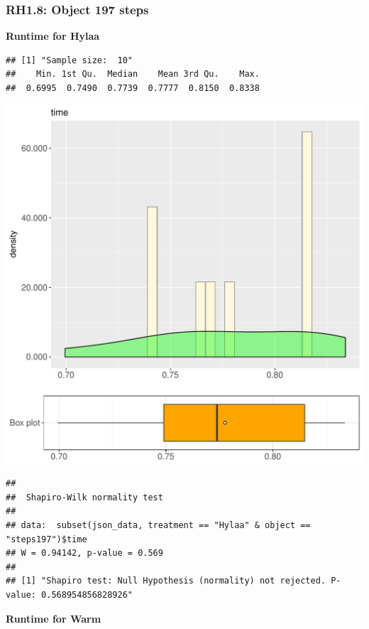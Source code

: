 \documentclass{article}\usepackage[]{graphicx}\usepackage[]{color}
\makeatletter
\def\maxwidth{ %
  \ifdim\Gin@nat@width>\linewidth
    \linewidth
  \else
    \Gin@nat@width
  \fi
}
\newenvironment{kframe}{%
 \def\at@end@of@kframe{}%
 \ifinner\ifhmode%
  \def\at@end@of@kframe{\end{minipage}}%
  \begin{minipage}{\columnwidth}%
 \fi\fi%
 \def\FrameCommand##1{\hskip\@totalleftmargin \hskip-\fboxsep
 \colorbox{shadecolor}{##1}\hskip-\fboxsep
     \hskip-\linewidth \hskip-\@totalleftmargin \hskip\columnwidth}%
 \MakeFramed {\advance\hsize-\width
   \@totalleftmargin\z@ \linewidth\hsize
   \@setminipage}}%
 {\par\unskip\endMakeFramed%
 \at@end@of@kframe}
\newenvironment{knitrout}{}{} %
\makeatother
\begin{document}
\subsubsection{RH1.8: Object 197 steps}

 \textbf{Runtime for Hylaa}
\begin{knitrout}
\color{fgcolor}\begin{kframe}
\begin{verbatim}
## [1] "Sample size:  10"
##    Min. 1st Qu.  Median    Mean 3rd Qu.    Max. 
##  0.6995  0.7490  0.7739  0.7777  0.8150  0.8338
\end{verbatim}
\end{kframe}
\includegraphics[width=\maxwidth]{figure/RH1_Hylaa_steps197-1} 
\begin{kframe}\begin{verbatim}
## 
## 	Shapiro-Wilk normality test
## 
## data:  subset(json_data, treatment == "Hylaa" & object == "steps197")$time
## W = 0.94142, p-value = 0.569
## 
## [1] "Shapiro test: Null Hypothesis (normality) not rejected. P-value: 0.568954856828926"
\end{verbatim}
\end{kframe}
\end{knitrout}
 \textbf{Runtime for Warm}
\end{document}
